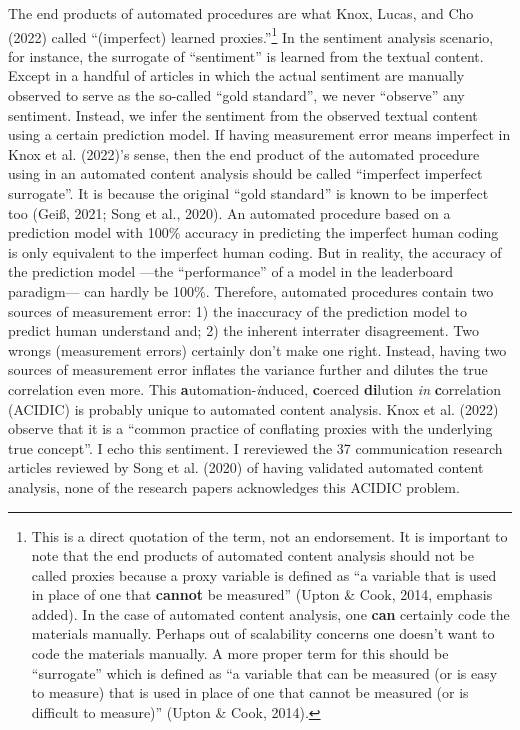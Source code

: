 \documentclass[english,man,floatsintext]{apa6}
\begin{document}
The end products of automated procedures are what Knox, Lucas, and Cho (2022) called \enquote{(imperfect) learned proxies.}\footnote{This is a direct quotation of the term, not an endorsement. It is important to note that the end products of automated content analysis should not be called proxies because a proxy variable is defined as \enquote{a variable that is used in place of one that \textbf{cannot} be measured} (Upton \& Cook, 2014, emphasis added). In the case of automated content analysis, one \textbf{can} certainly code the materials manually. Perhaps out of scalability concerns one doesn't want to code the materials manually. A more proper term for this should be \enquote{surrogate} which is defined as \enquote{a variable that can be measured (or is easy to measure) that is used in place of one that cannot be measured (or is difficult to measure)} (Upton \& Cook, 2014).} In the sentiment analysis scenario, for instance, the surrogate of \enquote{sentiment} is learned from the textual content. Except in a handful of articles in which the actual sentiment are manually observed to serve as the so-called \enquote{gold standard}, we never \enquote{observe} any sentiment. Instead, we infer the sentiment from the observed textual content using a certain prediction model. If having measurement error means imperfect in Knox et al. (2022)'s sense, then the end product of the automated procedure using in an automated content analysis should be called \enquote{imperfect imperfect surrogate}. It is because the original \enquote{gold standard} is known to be imperfect too (Geiß, 2021; Song et al., 2020). An automated procedure based on a prediction model with 100\% accuracy in predicting the imperfect human coding is only equivalent to the imperfect human coding. But in reality, the accuracy of the prediction model ---the \enquote{performance} of a model in the leaderboard paradigm--- can hardly be 100\%. Therefore, automated procedures contain two sources of measurement error: 1) the inaccuracy of the prediction model to predict human understand and; 2) the inherent interrater disagreement. Two wrongs (measurement errors) certainly don't make one right. Instead, having two sources of measurement error inflates the variance further and dilutes the true correlation even more. This \textbf{a}utomation-\emph{i}nduced, \textbf{c}oerced \textbf{di}lution \emph{in} \textbf{c}orrelation (ACIDIC) is probably unique to automated content analysis. Knox et al. (2022) observe that it is a \enquote{common practice of conflating proxies with the underlying true concept}. I echo this sentiment. I rereviewed the 37 communication research articles reviewed by Song et al. (2020) of having validated automated content analysis, none of the research papers acknowledges this ACIDIC problem.
\end{document}
